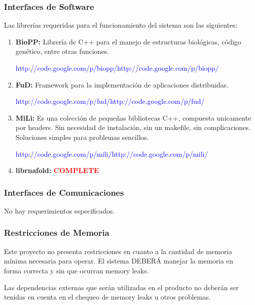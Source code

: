 \documentclass[12pt,a4paper,english,spanish]{article}
\begin{document}
	\subsubsection{Interfaces de Software}
		Las librerías requeridas para el funcionamiento del sistema son las siguientes:
		\begin{enumerate}
			\item \textbf{BioPP:} Librería de C++ para el manejo de estructuras biológicas, código
						genético, entre otras funciones. 
						\par \noindent \textcolor{blue}{http://code.google.com/p/biopp/http://code.google.com/p/biopp/}

			\item \textbf{FuD:} Framework para la implementación de aplicaciones distribuidas. 
						\par \noindent \textcolor{blue}{http://code.google.com/p/fud/http://code.google.com/p/fud/}

			\item \textbf{MiLi:} Es una colección de pequeñas bibliotecas C++, compuesta unicamente por headers. Sin necesidad de instalación, sin un 									makefile, sin complicaciones. Soluciones simples para problemas sencillos.
						\par \noindent \textcolor{blue}{http://code.google.com/p/mili/http://code.google.com/p/mili/}




			\item \textbf{librnafold:} \textbf{\textcolor{red}{COMPLETE}}
		\end{enumerate}

	\subsubsection{Interfaces de Comunicaciones}
		No hay requerimientos especificados.

	\subsubsection{Restricciones de Memoria}	
		\par Este proyecto no presenta restricciones en cuanto a la cantidad de memoria mínima necesaria para operar. El sistema DEBERÁ manejar la memoria 			en forma correcta y sin que ocurran memory leaks.
		\par Las dependencias externas que serán utilizadas en el producto no deberán ser tenidas en cuenta en el chequeo 
		de memory leaks u otros problemas.
		
\end{document}
